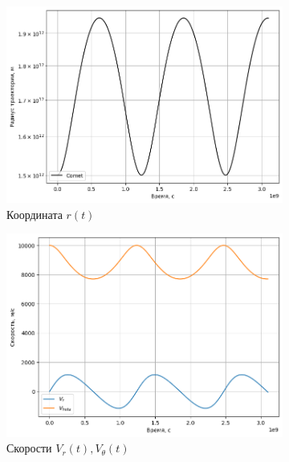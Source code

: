 \begin{figure}[H]
    \centering
    \begin{subfigure}{0.49\linewidth}
        \centering
		\includegraphics[width=1\linewidth]{imgs_8/rSunComet.png}
		\caption{Координата $r(t)$}
	\end{subfigure}
	\begin{subfigure}{0.49\linewidth}
        \centering
		\includegraphics[width=1\linewidth]{imgs_8/vSunComet.png}
		\caption{Скорости $V_r(t), V_\theta(t)$}
	\end{subfigure}
	\begin{subfigure}{0.49\linewidth}
        \centering

\end{subfigure}
\end{figure}
